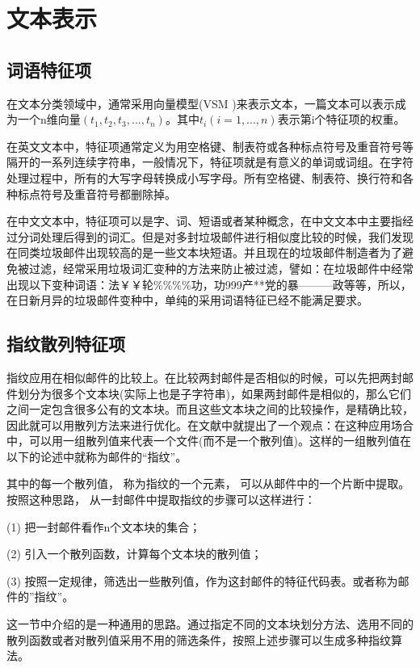 \section{文本表示}
\subsection{词语特征项}
在文本分类领域中，通常采用向量模型(VSM )来表示文本，一篇文本可以表示成为一个n维向量$(t_1,t_2,t_3,...,t_n)$。其中$t_i(i=1,...,n)$表示第i个特征项的权重。

在英文文本中，特征项通常定义为用空格键、制表符或各种标点符号及重音符号等隔开的一系列连续字符串，一般情况下，特征项就是有意义的单词或词组。在字符处理过程中，所有的大写字母转换成小写字母。所有空格键、制表符、换行符和各种标点符号及重音符号都删除掉。

在中文文本中，特征项可以是字、词、短语或者某种概念，在中文文本中主要指经过分词处理后得到的词汇。但是对多封垃圾邮件进行相似度比较的时候，我们发现在同类垃圾邮件出现较高的是一些文本块短语。并且现在的垃圾邮件制造者为了避免被过滤，经常采用垃圾词汇变种的方法来防止被过滤，譬如：在垃圾邮件中经常出现以下变种词语：法￥￥轮\%\%\%\%功，功999产**党的暴———政等等，所以，在日新月异的垃圾邮件变种中，单纯的采用词语特征已经不能满足要求。

\subsection{指纹散列特征项}
指纹应用在相似邮件的比较上。在比较两封邮件是否相似的时候，可以先把两封邮件划分为很多个文本块(实际上也是子字符串)，如果两封邮件是相似的，那么它们之间一定包含很多公有的文本块。而且这些文本块之间的比较操作，是精确比较，因此就可以用散列方法来进行优化。在文献\cite{Manber1994Finding}中就提出了一个观点：在这种应用场合中，可以用一组散列值来代表一个文件(而不是一个散列值)。这样的一组散列值在以下的论述中就称为邮件的“指纹”。

其中的每一个散列值， 称为指纹的一个元素， 可以从邮件中的一个片断中提取。按照这种思路， 从一封邮件中提取指纹的步骤可以这样进行：

(1) 把一封邮件看作n个文本块的集合；

(2) 引入一个散列函数，计算每个文本块的散列值；

(3) 按照一定规律，筛选出一些散列值，作为这封邮件的特征代码表。或者称为邮件的”指纹”。

这一节中介绍的是一种通用的思路。通过指定不同的文本块划分方法、选用不同的散列函数或者对散列值采用不用的筛选条件，按照上述步骤可以生成多种指纹算法。

